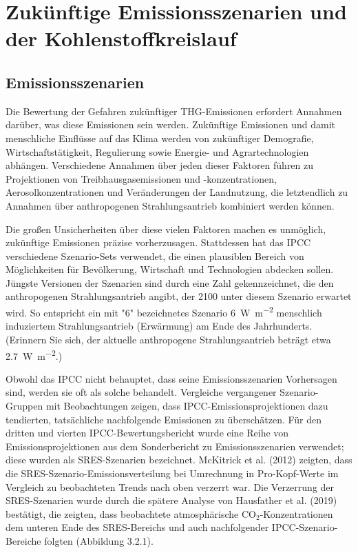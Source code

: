\documentclass[12pt,paper=a4,DIV=12,parskip=never,chapterprefix=false,headings=standardclasses]{scrreprt}
\begin{document}
\section{Zukünftige Emissionsszenarien und der Kohlenstoffkreislauf}

\subsection{Emissionsszenarien}

Die Bewertung der Gefahren zukünftiger THG-Emissionen erfordert Annahmen darüber, was diese Emissionen sein werden. Zukünftige Emissionen und damit menschliche Einflüsse auf das Klima werden von zukünftiger Demografie, Wirtschaftstätigkeit, Regulierung sowie Energie- und Agrartechnologien abhängen. Verschiedene Annahmen über jeden dieser Faktoren führen zu Projektionen von Treibhausgasemissionen und -konzentrationen, Aerosolkonzentrationen und Veränderungen der Landnutzung, die letztendlich zu Annahmen über anthropogenen Strahlungsantrieb kombiniert werden können.

Die großen Unsicherheiten über diese vielen Faktoren machen es unmöglich, zukünftige Emissionen präzise vorherzusagen. Stattdessen hat das IPCC verschiedene Szenario-Sets verwendet, die einen plausiblen Bereich von Möglichkeiten für Bevölkerung, Wirtschaft und Technologien abdecken sollen. Jüngste Versionen der Szenarien sind durch eine Zahl gekennzeichnet, die den anthropogenen Strahlungsantrieb angibt, der 2100 unter diesem Szenario erwartet wird. So entspricht ein mit "6" bezeichnetes Szenario \SI{6}{\watt\per\square\meter} menschlich induziertem Strahlungsantrieb (Erwärmung) am Ende des Jahrhunderts. (Erinnern Sie sich, der aktuelle anthropogene Strahlungsantrieb beträgt etwa \SI{2.7}{\watt\per\square\meter}.)

Obwohl das IPCC nicht behauptet, dass seine Emissionsszenarien Vorhersagen sind, werden sie oft als solche behandelt. Vergleiche vergangener Szenario-Gruppen mit Beobachtungen zeigen, dass IPCC-Emissionsprojektionen dazu tendierten, tatsächliche nachfolgende Emissionen zu überschätzen. Für den dritten und vierten IPCC-Bewertungsbericht wurde eine Reihe von Emissionsprojektionen aus dem Sonderbericht zu Emissionsszenarien verwendet; diese wurden als SRES-Szenarien bezeichnet. McKitrick et al. (2012) zeigten, dass die SRES-Szenario-Emissionsverteilung bei Umrechnung in Pro-Kopf-Werte im Vergleich zu beobachteten Trends nach oben verzerrt war. Die Verzerrung der SRES-Szenarien wurde durch die spätere Analyse von Hausfather et al. (2019) bestätigt, die zeigten, dass beobachtete atmosphärische CO$_2$-Konzentrationen dem unteren Ende des SRES-Bereichs und auch nachfolgender IPCC-Szenario-Bereiche folgten (Abbildung 3.2.1).
\end{document}
